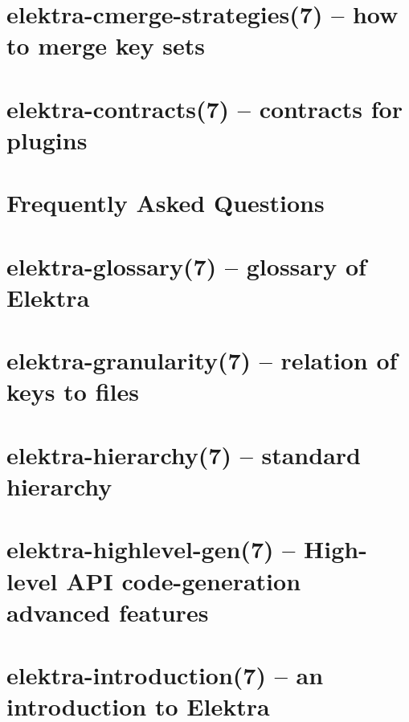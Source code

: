 \let\mypdfximage\pdfximage\def\pdfximage{\immediate\mypdfximage}\documentclass[twoside]{book}
\newcommand{\+}{\discretionary{\mbox{\scriptsize$\hookleftarrow$}}{}{}}
\begin{document}
\chapter{elektra-\/cmerge-\/strategies(7) -- how to merge key sets}
\label{doc_help_elektra-cmerge-strategy_md}

\chapter{elektra-\/contracts(7) -- contracts for plugins}
\label{doc_help_elektra-contracts_md}

\chapter{Frequently Asked Questions}
\label{doc_help_elektra-faq_md}

\chapter{elektra-\/glossary(7) -- glossary of Elektra}
\label{doc_help_elektra-glossary_md}

\chapter{elektra-\/granularity(7) -- relation of keys to files}
\label{doc_help_elektra-granularity_md}

\chapter{elektra-\/hierarchy(7) -- standard hierarchy}
\label{doc_help_elektra-hierarchy_md}

\chapter{elektra-\/highlevel-\/gen(7) -- High-\/level API code-\/generation advanced features}
\label{doc_help_elektra-highlevel-gen_md}

\chapter{elektra-\/introduction(7) -- an introduction to Elektra}
\label{doc_help_elektra-introduction_md}

\end{document}
